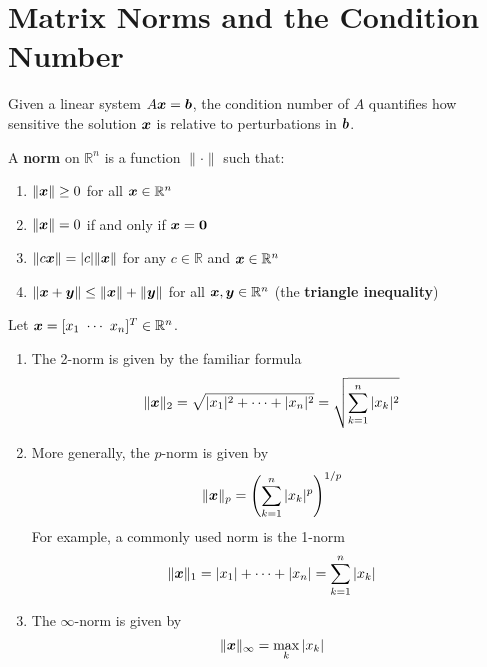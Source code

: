 \section{Matrix Norms and the Condition Number}

\begin{bigidea}
Given a linear system $A \boldsymbol{x} = \boldsymbol{b}$, the condition number of $A$ quantifies how sensitive the solution $\boldsymbol{x}$ is relative to perturbations in $\boldsymbol{b}$.
\end{bigidea}

\begin{definition}
A {\bf norm} on $\mathbb{R}^n$ \cite[p.53]{MH} is a function $\| \cdot \|$ such that:
\begin{enumerate}
\item $\| \boldsymbol{x} \| \geq 0$ for all $\boldsymbol{x} \in \mathbb{R}^n$
\item $\| \boldsymbol{x} \| = 0$ if and only if $\boldsymbol{x} = \boldsymbol{0}$
\item $\| c \boldsymbol{x} \| = |c| \| \boldsymbol{x} \|$ for any $c \in \mathbb{R}$ and $\boldsymbol{x} \in \mathbb{R}^n$
\item $\| \boldsymbol{x} + \boldsymbol{y} \| \leq \| \boldsymbol{x} \| + \| \boldsymbol{y} \|$ for all $\boldsymbol{x} , \boldsymbol{y} \in \mathbb{R}^n$ (the {\bf triangle inequality})
\end{enumerate}
\end{definition}

\begin{example} Let $\boldsymbol{x} = [x_1 \ \cdots \ x_n ]^T \in \mathbb{R}^n$.
\begin{enumerate}
\item The 2-norm is given by the familiar formula
$$
\| \boldsymbol{x} \|_2 = \sqrt{ | x_1|^2 + \cdots + | x_n |^2 } = \sqrt{ \sum_{k=1}^n | x_k |^2 }
$$
\item More generally, the $p$-norm is given by
$$
\| \boldsymbol{x} \|_p = \left( \sum_{k=1}^n | x_k |^p \right)^{1/p}
$$
For example, a commonly used norm is the 1-norm
$$
\| \boldsymbol{x} \|_1 =  | x_1| + \cdots + | x_n | = \sum_{k=1}^n | x_k |
$$
\item The $\infty$-norm is given by
$$
\| \boldsymbol{x} \|_{\infty} = \max_k | x_k |
$$
\end{enumerate}
\end{example}

